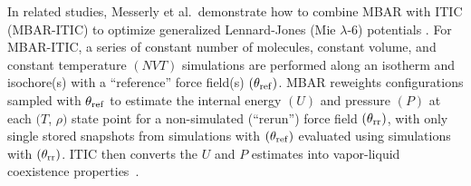 \documentclass[journal=jced,manuscript=article]{achemso}
\begin{document}


In related studies, Messerly et al.~demonstrate how to combine MBAR with ITIC (MBAR-ITIC) to optimize generalized Lennard-Jones (Mie $\lambda$-6) potentials \cite{Postdoc_1,Postdoc_2}. For MBAR-ITIC, a series of constant number of molecules, constant volume, and constant temperature $(NVT)$ simulations are performed along an isotherm and isochore(s) with a ``reference'' force field(s) $(\theta_{\rm ref})$. MBAR reweights configurations sampled with $\theta_{\rm ref}$ to estimate the internal energy $(U)$ and pressure $(P)$ at each $(T$, $\rho)$ state point for a non-simulated 
(``rerun'') force field $(\theta_{\rm rr})$, with only single stored snapshots from simulations with $(\theta_{\rm ref})$ evaluated using simulations with $(\theta_{\rm rr})$. ITIC then converts the $U$ and $P$ estimates into vapor-liquid coexistence properties~\cite{Mostafa_Diss,Mostafa2018}.

\end{document}
